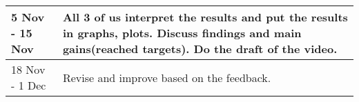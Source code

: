 \begin{tabular}{|p{2.5cm}|p{4.8cm}|p{4.8cm}|p{4.8cm}|}
    5 Nov - 15 Nov  &      \multicolumn{3}{|p{14.4cm}|}{All 3 of us interpret the results and put the results in graphs, plots. Discuss findings and main gains(reached targets). Do the draft of the video.}                                       \\ \hline
    18 Nov - 1 Dec  & \multicolumn{3}{|p{14.4cm}|}{Revise and improve based on the feedback.                                                                                                                                                          }                                                                                                                                                     \\ \hline
    \end{tabular}

\FloatBarrier